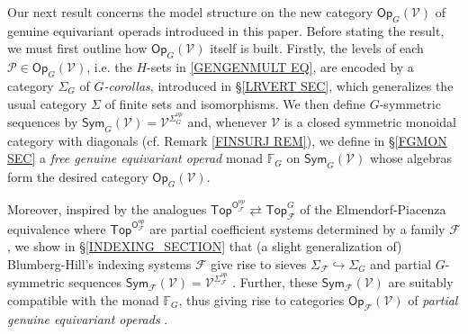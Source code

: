 \documentclass[a4paper,10pt
,draft
]{article}%
\numberwithin{equation}{section}
\numberwithin{figure}{section}
\theoremstyle{definition} %
\newcommand{\Sym}{\ensuremath{\mathsf{Sym}}}%
\newcommand{\V}{\ensuremath{\mathcal V}}
\newcommand{\1}{\ensuremath{\mathbbm 1}}%
\begin{document}

Our next result concerns the model structure
on the new category 
$\mathsf{Op}_G (\mathcal{V})$ of genuine equivariant operads
introduced in this paper. Before stating the result, we must first outline how 
$\mathsf{Op}_G (\mathcal{V})$
itself is built.
Firstly, the levels of each 
$\mathcal{P} \in \mathsf{Op}_G(\mathcal{V})$,
i.e. the $H$-sets in \eqref{GENGENMULT EQ},
are encoded by a category $\Sigma_G$ of 
\textit{$G$-corollas}, introduced in \S \ref{LRVERT SEC},
which generalizes the usual category 
$\Sigma$ of finite sets and isomorphisms.
We then define $G$-symmetric sequences by
$\mathsf{Sym}_G(\mathcal{V})=
\mathcal{V}^{\Sigma_G^{op}}$
\index{categories!SymG@$\Sym_G(\mathcal V) = \V^{\Sigma_G^{op}}$}
and,
whenever $\mathcal{V}$ is a closed symmetric monoidal category with diagonals 
(cf. Remark \ref{FINSURJ REM}),
we define in \S \ref{FGMON SEC}
a \textit{free genuine equivariant operad} monad 
$\mathbb{F}_G$ on
$\mathsf{Sym}_G(\mathcal{V})$
whose algebras form the desired category 
$\mathsf{Op}_G(\mathcal{V})$.

Moreover, inspired by the analogues
$\mathsf{Top}^{\mathsf{O}_{\mathcal{F}}^{op}}
	\rightleftarrows 
\mathsf{Top}^G_{\mathcal{F}}$
of the Elmendorf-Piacenza equivalence
where 
$\mathsf{Top}^{\mathsf{O}_{\mathcal{F}}^{op}}$
are partial coefficient systems determined by a family $\mathcal{F}$, 
we show in \S \ref{INDEXING_SECTION}
that (a slight generalization of)
Blumberg-Hill's indexing systems $\mathcal{F}$
give rise to sieves 
$\Sigma_{\mathcal{F}} \hookrightarrow \Sigma_G$
and partial $G$-symmetric sequences
$\mathsf{Sym_{\mathcal{F}}}(\mathcal{V})
=
\mathcal{V}^{\Sigma_{\mathcal{F}}^{op}}$
.
Further, these 
$\mathsf{Sym_{\mathcal{F}}}(\mathcal{V})$
are suitably compatible with the monad
$\mathbb{F}_G$,
thus giving rise to categories
$\mathsf{Op}_{\mathcal{F}}(\mathcal{V})$
of \textit{partial genuine equivariant operads}
.
\end{document}

